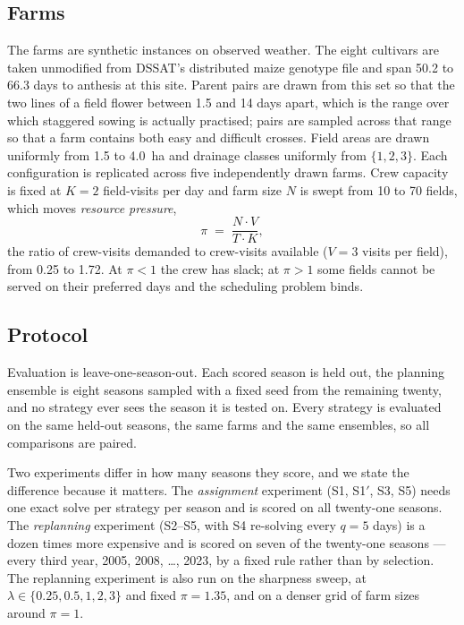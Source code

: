 \documentclass[10pt,twocolumn]{article}
\begin{document}
\subsection{Farms}

The farms are synthetic instances on observed weather. The eight cultivars
are taken unmodified from DSSAT's distributed maize genotype file and span
50.2 to 66.3 days to anthesis at this site. Parent pairs are drawn from this
set so that the two lines of a field flower between 1.5 and 14 days apart,
which is the range over which staggered sowing is actually practised; pairs
are sampled across that range so that a farm contains both easy and
difficult crosses. Field areas are drawn uniformly from 1.5 to 4.0~ha and
drainage classes uniformly from $\{1,2,3\}$. Each configuration is
replicated across five independently drawn farms. Crew capacity is fixed at
$K = 2$ field-visits per day and farm size $N$ is swept from 10 to 70
fields, which moves \emph{resource pressure},
\[
  \pi \;=\; \frac{N \cdot V}{T \cdot K},
\]
the ratio of crew-visits demanded to crew-visits available ($V = 3$ visits
per field), from 0.25 to 1.72. At $\pi < 1$ the crew has slack; at $\pi > 1$
some fields cannot be served on their preferred days and the scheduling
problem binds.

\subsection{Protocol}

Evaluation is leave-one-season-out. Each scored season is held out, the
planning ensemble is eight seasons sampled with a fixed seed from the
remaining twenty, and no strategy ever sees the season it is tested on.
Every strategy is evaluated on the same held-out seasons, the same farms
and the same ensembles, so all comparisons are paired.

Two experiments differ in how many seasons they score, and we state the
difference because it matters. The \emph{assignment} experiment (S1, S1$'$,
S3, S5) needs one exact solve per strategy per season and is scored on all
twenty-one seasons. The \emph{replanning} experiment (S2--S5, with S4
re-solving every $q = 5$ days) is a dozen times more expensive and is
scored on seven of the twenty-one seasons --- every third year, 2005, 2008,
\dots, 2023, by a fixed rule rather than by selection. The replanning
experiment is also run on the sharpness sweep, at $\lambda \in \{0.25, 0.5,
1, 2, 3\}$ and fixed $\pi = 1.35$, and on a denser grid of farm sizes
around $\pi = 1$.
\end{document}
